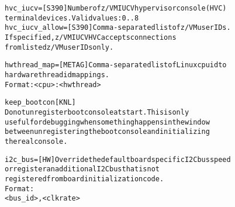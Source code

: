 \documentclass[a4paper,8pt,english]{sphinxmanual}
\begin{document}
\begin{alltt}
        hvc\_iucv=       {[}S390{]} Number of z/VM IUCV hypervisor console (HVC)
                               terminal devices. Valid values: 0..8
        hvc\_iucv\_allow= {[}S390{]} Comma-separated list of z/VM user IDs.
                               If specified, z/VM IUCV HVC accepts connections
                               from listed z/VM user IDs only.

        hwthread\_map=   {[}METAG{]} Comma-separated list of Linux cpu id to
                                hardware thread id mappings.
                                Format: \textless{}cpu\textgreater{}:\textless{}hwthread\textgreater{}

        keep\_bootcon    {[}KNL{]}
                        Do not unregister boot console at start. This is only
                        useful for debugging when something happens in the window
                        between unregistering the boot console and initializing
                        the real console.

        i2c\_bus=        {[}HW{]} Override the default board specific I2C bus speed
                             or register an additional I2C bus that is not
                             registered from board initialization code.
                             Format:
                             \textless{}bus\_id\textgreater{},\textless{}clkrate\textgreater{}


\end{alltt}
\end{document}
